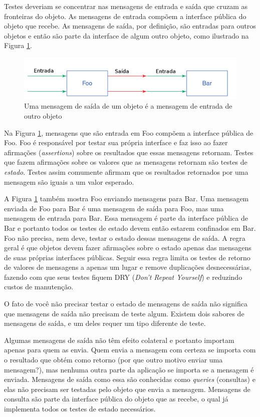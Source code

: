Testes deveriam se concentrar nas mensagens de entrada e saída que cruzam as fronteiras do objeto. As mensagens de entrada compõem a interface pública do objeto que recebe. As mensagens de saída, por definição, são entradas para outros objetos e então são parte da interface de algum outro objeto, como ilustrado na Figura \ref{img:dependencia}.

\begin{figure}[!htbp]
  \center
  \includegraphics[scale=0.40]{imagens/dependencia.png}
  \caption{Uma mensagem de saída de um objeto é a mensagem de entrada de outro objeto}
  \label{img:dependencia}
\end{figure}

Na Figura \ref{img:dependencia}, mensagens que são entrada em Foo compõem a interface pública de Foo. Foo é responsável por testar sua própria interface e faz isso ao fazer afirmações (\textit{assertions}) sobre os resultados que essas mensagens retornam. Testes que fazem afirmações sobre os valores que as mensagens retornam são testes de \textit{estado}. Testes assim comumente afirmam que os resultados retornados por uma mensagem são iguais a um valor esperado.

A Figura \ref{img:dependencia} também mostra Foo enviando mensagens para Bar. Uma mensagem enviada de Foo para Bar é uma mensagem de saída para Foo, mas uma mensagem de entrada para Bar. Essa mensagem é parte da interface pública de Bar e portanto todos os testes de estado devem então estarem confinados em Bar. Foo não precisa, nem deve, testar o estado dessas mensagens de saída. A regra geral é que objetos devem fazer afirmações sobre o estado apenas das mensagens de suas próprias interfaces públicas. Seguir essa regra limita os testes de retorno de valores de mensagens a apenas um lugar e remove duplicações desnecessárias, fazendo com que seus testes fiquem DRY (\textit{Don't Repeat Yourself}) e reduzindo custos de manutenção.

O fato de você não precisar testar o estado de mensagens de saída não significa que mensagens de saída não precisam de teste algum. Existem dois sabores de mensagens de saída, e um deles requer um tipo diferente de teste.

Algumas mensagens de saída não têm efeito colateral e portanto importam apenas para quem as envia. Quem envia a mensagem com certeza se importa com o resultado que obtém como retorno (por que outro motivo enviar uma mensagem?), mas nenhuma outra parte da aplicação se importa se a mensagem é enviada. Mensagens de saída como essa são conhecidas como \textit{queries} (consultas) e elas não precisam ser testadas pelo objeto que envia a mensagem. Mensagens de consulta são parte da interface pública do objeto que as recebe, o qual já implementa todos os testes de estado necessários.

